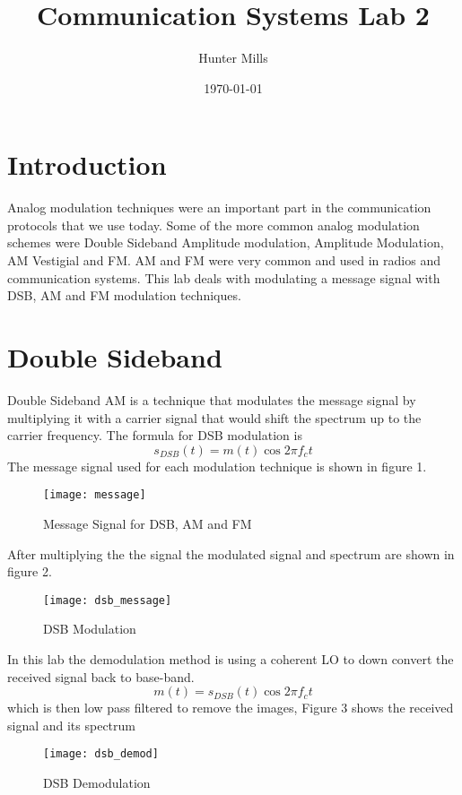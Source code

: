 \documentclass{article}
\title{Communication Systems Lab 2}
\author{Hunter Mills}
\date{\today}
\begin{document}
    \maketitle

    \medskip

    \section{Introduction}
    Analog modulation techniques were an important part in the communication protocols that we use today.
    Some of the more common analog modulation schemes were Double Sideband Amplitude modulation, Amplitude
    Modulation, AM Vestigial and FM. AM and FM were very common and used in radios and communication systems.
    This lab deals with modulating a message signal with DSB, AM and FM modulation techniques. 
    \section{Double Sideband}
    Double Sideband AM is a technique that modulates the message signal by multiplying it with a carrier
    signal that would shift the spectrum up to the carrier frequency. The formula for DSB modulation is
    \begin{equation}
        s_{DSB}(t) = m(t)\cos2\pi f_ct
    \end{equation}
    The message signal used for each modulation technique is shown in figure 1.
    \begin{figure}[!htb]
        \centering
        \texttt{[image: message]}
        \caption{Message Signal for DSB, AM and FM}
    \end{figure}
    After multiplying the the signal the modulated signal and spectrum are shown in figure 2.
    \begin{figure}[!htb]
        \centering
        \texttt{[image: dsb\_message]}
        \caption{DSB Modulation}
    \end{figure}
    In this lab the demodulation method is using a coherent LO to down convert the received signal back to
    base-band. 
    \begin{equation}
        m(t) = s_{DSB}(t)\cos2\pi f_ct
    \end{equation}
    which is then low pass filtered to remove the images, Figure 3 shows the received signal and its spectrum
    \begin{figure}[!htb]
        \centering
        \texttt{[image: dsb\_demod]}
        \caption{DSB Demodulation}
    \end{figure}
\end{document}
